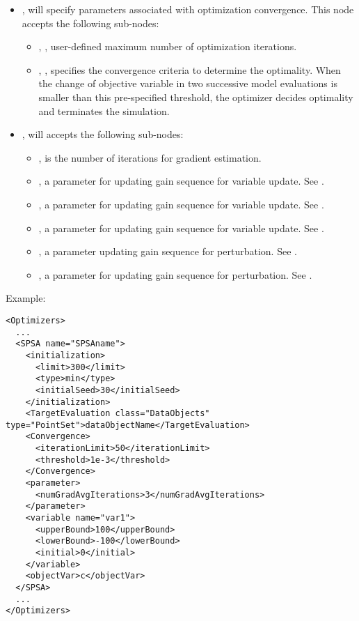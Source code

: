 \begin{itemize}
\item {},  will specify parameters associated with optimization convergence. This node accepts the following sub-nodes:
  \begin{itemize}
  \item {}, , user-defined maximum number of optimization iterations.
  \item {}, , specifies the convergence criteria to determine the optimality. When the change of objective variable in two successive model evaluations is smaller than this pre-specified threshold, the  optimizer decides optimality and terminates the simulation.
  \end{itemize}
\item {},  will accepts the following sub-nodes:
  \begin{itemize}
  \item {},  is the number of iterations for gradient estimation.
  \item {},  a parameter for updating gain sequence for variable update. See \cite{spall1998implementation}.
  \item {},  a parameter for updating gain sequence for variable update. See \cite{spall1998implementation}.
  \item {},  a parameter for updating gain sequence for variable update. See \cite{spall1998implementation}.
  \item {},  a parameter updating gain sequence for perturbation. See \cite{spall1998implementation}.
  \item {},  a parameter for updating gain sequence for perturbation. See \cite{spall1998implementation}.
  \end{itemize}
\end{itemize}


Example:
\begin{lstlisting}[style=XML]
<Optimizers>
  ...
  <SPSA name="SPSAname">
    <initialization>
      <limit>300</limit>
      <type>min</type>
      <initialSeed>30</initialSeed>
    </initialization>
    <TargetEvaluation class="DataObjects" type="PointSet">dataObjectName</TargetEvaluation>
    <Convergence>
      <iterationLimit>50</iterationLimit>
      <threshold>1e-3</threshold>
    </Convergence>
    <parameter>
      <numGradAvgIterations>3</numGradAvgIterations>
    </parameter>
    <variable name="var1">
      <upperBound>100</upperBound>
      <lowerBound>-100</lowerBound>
      <initial>0</initial>
    </variable>
    <objectVar>c</objectVar>
  </SPSA>
  ...
</Optimizers>
\end{lstlisting}
